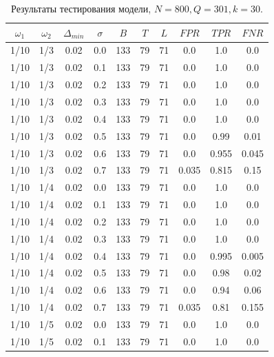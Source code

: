 \documentclass[specialist, substylefile = spbu.rtx,
			   subf, href, 12pt]{disser}
\begin{document}
\begin{table}[!hhh]
	\center
	\caption{Результаты тестирования модели, $ N = 800, Q=301, k=30 $.}
	\begin{tabular}{cccccccccc}
		\toprule
		$ \omega_1 $ & $ \omega_2 $ & $ \Delta_{min} $ & $ \sigma $ &    $ B $ &   $ T $ &   $ L $ &    $ FPR $ &    $ TPR $ &    $ FNR $ \\
		\midrule
		1/10 &      1/3 &       0.02 &    0.0 & 133 & 79 & 71 &    0.0 &    1.0 &    0.0 \\
		1/10 &      1/3 &       0.02 &    0.1 & 133 & 79 & 71 &    0.0 &    1.0 &    0.0 \\
		1/10 &      1/3 &       0.02 &    0.2 & 133 & 79 & 71 &    0.0 &    1.0 &    0.0 \\
		1/10 &      1/3 &       0.02 &    0.3 & 133 & 79 & 71 &    0.0 &    1.0 &    0.0 \\
		1/10 &      1/3 &       0.02 &    0.4 & 133 & 79 & 71 &    0.0 &    1.0 &    0.0 \\
		1/10 &      1/3 &       0.02 &    0.5 & 133 & 79 & 71 &    0.0 &   0.99 &   0.01 \\
		1/10 &      1/3 &       0.02 &    0.6 & 133 & 79 & 71 &    0.0 &  0.955 &  0.045 \\
		1/10 &      1/3 &       0.02 &    0.7 & 133 & 79 & 71 &  0.035 &  0.815 &   0.15 \\
		\hline
		1/10 &      1/4 &       0.02 &    0.0 & 133 & 79 & 71 &    0.0 &    1.0 &    0.0 \\
		1/10 &      1/4 &       0.02 &    0.1 & 133 & 79 & 71 &    0.0 &    1.0 &    0.0 \\
		1/10 &      1/4 &       0.02 &    0.2 & 133 & 79 & 71 &    0.0 &    1.0 &    0.0 \\
		1/10 &      1/4 &       0.02 &    0.3 & 133 & 79 & 71 &    0.0 &    1.0 &    0.0 \\
		1/10 &      1/4 &       0.02 &    0.4 & 133 & 79 & 71 &    0.0 &  0.995 &  0.005 \\
		1/10 &      1/4 &       0.02 &    0.5 & 133 & 79 & 71 &    0.0 &   0.98 &   0.02 \\
		1/10 &      1/4 &       0.02 &    0.6 & 133 & 79 & 71 &    0.0 &   0.94 &   0.06 \\
		1/10 &      1/4 &       0.02 &    0.7 & 133 & 79 & 71 &  0.035 &   0.81 &  0.155 \\
		\hline
		1/10 &      1/5 &       0.02 &    0.0 & 133 & 79 & 71 &    0.0 &    1.0 &    0.0 \\
		1/10 &      1/5 &       0.02 &    0.1 & 133 & 79 & 71 &    0.0 &    1.0 &    0.0 \\

\end{tabular}
\end{table}
\end{document}

